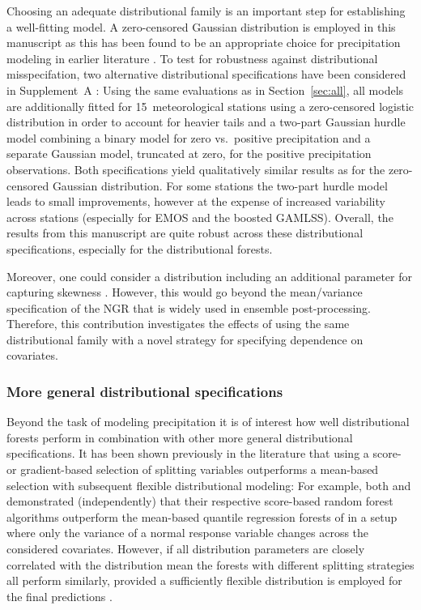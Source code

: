 \documentclass[aoas, preprint]{imsart}
\numberwithin{equation}{subsection}
\begin{document}
Choosing an adequate distributional family is an important step for
establishing a well-fitting model. A zero-censored Gaussian distribution is
employed in this manuscript as this has been found to be an appropriate choice
for precipitation modeling in earlier literature
\citep[e.g.,][]{Stauffer+Mayr+Messner:2017}. 
To test for robustness against distributional misspecifation, 
two alternative distributional specifications have been considered
in Supplement~A \citep{Schlosser+Hothorn+Stauffer:2019a}: Using the
same evaluations as in Section~\ref{sec:all}, all models are
additionally fitted for 15~meteorological stations using a zero-censored
logistic distribution in order to account for heavier tails and a two-part
Gaussian hurdle model combining a binary model for zero vs.~positive
precipitation and a separate Gaussian model, truncated at zero, for the
positive precipitation observations. Both specifications yield qualitatively 
similar results as for the zero-censored Gaussian distribution. For some stations
the two-part hurdle model leads to small improvements, however at the expense
of increased variability across stations (especially for EMOS and the 
boosted GAMLSS). Overall, the results from this manuscript are quite
robust across these distributional specifications, especially for the
distributional forests.

Moreover, one could consider a distribution including an additional parameter
for capturing skewness \citep[as in][]{Scheuerer+Hamill:2015, Baran+Nemoda:2016}. 
However, this would go beyond the mean/variance specification of the NGR
that is widely used in ensemble post-processing. Therefore, this contribution
investigates the effects of using the same distributional family with a novel
strategy for specifying dependence on covariates.


\subsubsection*{More general distributional specifications}

Beyond the task of modeling precipitation it is of interest how well distributional
forests perform in combination with other more general distributional specifications.
It has been shown previously in the literature that using a score- or gradient-based
selection of splitting variables outperforms a mean-based selection with subsequent
flexible distributional modeling: For example, both \citet[][Figure~2]{Athey+Tibshirani+Wager:2019}
and \citet[][Figure~1]{Hothorn+Zeileis:2017} demonstrated (independently) that their
respective score-based random forest algorithms outperform the mean-based quantile
regression forests of \cite{Meinshausen:2006} in a setup where only the variance of a normal
response variable changes across the considered covariates. However, if all distribution
parameters are closely correlated with the distribution mean the forests with different
splitting strategies all perform similarly, provided a sufficiently flexible distribution
is employed for the final predictions \citep[see][Section~7]{Hothorn+Zeileis:2017}.
\end{document}
